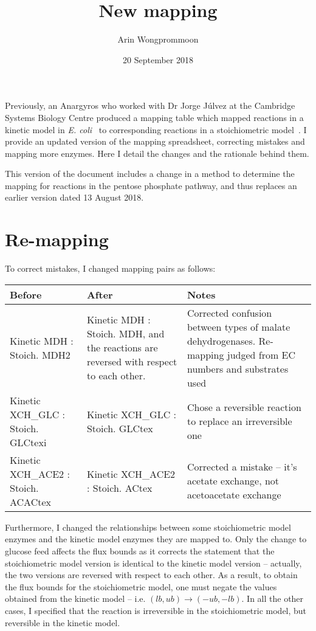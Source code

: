 \documentclass[parskip=full]{scrartcl}
\author{Arin Wongprommoon}
\title{New mapping}
\date{20 September 2018}
\begin{document}
\maketitle


Previously, an Anargyros who worked with Dr Jorge J\'ulvez at the Cambridge Systems Biology Centre produced a mapping table which mapped reactions in a kinetic model in \emph{E. coli}~\cite{millard_metabolic_2017} to corresponding reactions in a stoichiometric model~\cite{orth_comprehensive_2011}. I provide an updated version of the mapping spreadsheet, correcting mistakes and mapping more enzymes. Here I detail the changes and the rationale behind them.

This version of the document includes a change in a method to determine the mapping for reactions in the pentose phosphate pathway, and thus replaces an earlier version dated 13 August 2018.

\section{Re-mapping}
\label{sec:remapping}

To correct mistakes, I changed mapping pairs as follows:

\begin{tabularx}{\linewidth}{|L|L|L|}
  \hline
  Before & After & Notes\\
  \hline
  Kinetic MDH : Stoich. MDH2 & Kinetic MDH : Stoich. MDH, and the reactions are reversed with respect to each other. & Corrected confusion between types of malate dehydrogenases. Re-mapping judged from EC numbers and substrates used\\
  \hline
  Kinetic XCH\_GLC : Stoich. GLCtexi & Kinetic XCH\_GLC : Stoich. GLCtex & Chose a reversible reaction to replace an irreversible one\\
  \hline
  Kinetic XCH\_ACE2 : Stoich. ACACtex & Kinetic XCH\_ACE2 : Stoich. ACtex & Corrected a mistake -- it's acetate exchange, not acetoacetate exchange\\
  \hline
\end{tabularx}

Furthermore, I changed the relationships between some stoichiometric model enzymes and the kinetic model enzymes they are mapped to. Only the change to glucose feed affects the flux bounds as it corrects the statement that the stoichiometric model version is identical to the kinetic model version -- actually, the two versions are reversed with respect to each other. As a result, to obtain the flux bounds for the stoichiometric model, one must negate the values obtained from the kinetic model -- i.e. $(lb, ub) \rightarrow (-ub, -lb)$. In all the other cases, I specified that the reaction is irreversible in the stoichiometric model, but reversible in the kinetic model.
\end{document}
